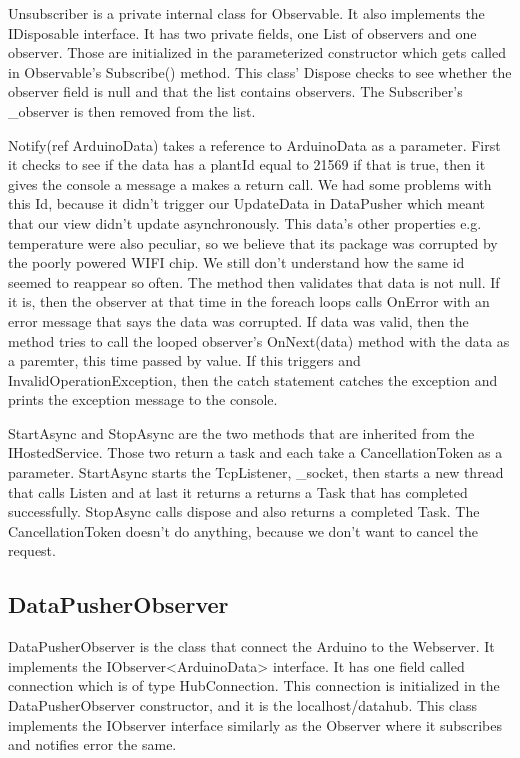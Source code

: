 \documentclass[a4paper,12pt,twoside,openright,titlepage]{book}
\begin{document}
Unsubscriber is a private internal class for Observable. It also implements the IDisposable interface.  It has two private fields, one List of observers and one observer. Those are initialized in the parameterized constructor which gets called in Observable's Subscribe() method. This class' Dispose checks to see whether the observer field is null and that the list contains observers. The Subscriber's \_observer is then removed from the list.

Notify(ref ArduinoData) takes a reference to ArduinoData as a parameter. First it checks to see if the data has a plantId equal to 21569 if that is true, then it gives the console a message a makes a return call. We had some problems with this Id, because it didn't trigger our UpdateData in DataPusher which meant that our view didn't update asynchronously. This data's other properties e.g. temperature were also peculiar, so we believe that its package was corrupted by the poorly powered WIFI chip. We still don't understand how the same id seemed to reappear so often. 
The method then validates that data is not null. If it is, then the observer at that time in the foreach loops calls OnError with an error message that says the data was corrupted. If data was valid, then the method tries to call the looped observer's OnNext(data) method with the data as a paremter, this time passed by value. If this triggers and InvalidOperationException, then the catch statement catches the exception and prints the exception message to the console. 

StartAsync and StopAsync are the two methods that are inherited from the IHostedService. Those two return a task and each take a CancellationToken as a parameter. StartAsync starts the TcpListener, \_socket, then starts a new thread that calls Listen and at last it returns a returns a Task that has completed successfully. StopAsync calls dispose and also returns a completed Task. The CancellationToken doesn't do anything, because we don't want to cancel the request.


\subsection{DataPusherObserver}

DataPusherObserver is the class that connect the Arduino to the Webserver. It implements the IObserver<ArduinoData> interface. It has one field called connection which is of type HubConnection. This connection is initialized in the DataPusherObserver constructor, and it is the localhost/datahub. This class implements the IObserver interface similarly as the Observer where it subscribes and notifies error the same.
\end{document}
